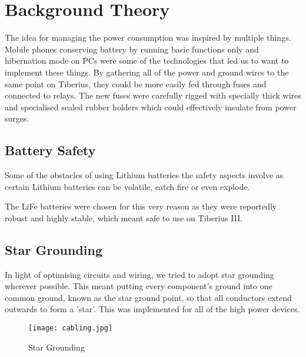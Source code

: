 \section{Background Theory}
The idea for managing the power consumption was inspired by multiple things.  Mobile phones conserving battery by running basic functions only and hibernation mode on PCs were some of the technologies that led us to want to implement these things.  By gathering all of the power and ground wires to the same point on Tiberius, they could be more easily fed through fuses and connected to relays.  The new fuses were carefully rigged with specially thick wires and specialised sealed rubber holders which could effectively insulate from power surges.

\subsection{Battery Safety}

Some of the obstacles of using Lithium batteries the safety aspects involve as certain Lithium batteries can be volatile, catch fire or even explode.

The LiFe batteries were chosen for this very reason as they were reportedly robust and highly stable, which meant safe to use on Tiberius III.

\subsection{Star Grounding}
In light of optimising circuits and wiring, we tried to adopt star grounding wherever possible.  This meant putting every component's ground into one common ground, known as the star ground point, so that all conductors extend outwards to form a 'star'. This was implemented for all of the high power devices.

\begin{figure}[!htb]
\begin{center}
\texttt{[image: cabling.jpg]}
\end{center}
\caption{Star Grounding}
\label{fig:Cabling}
\end{figure}